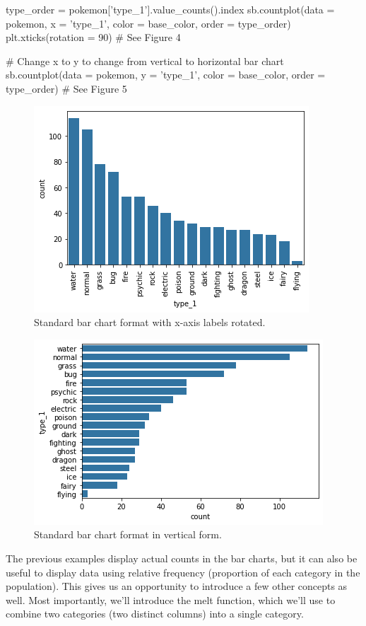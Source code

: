\begin{python}
	type_order = pokemon['type_1'].value_counts().index
	sb.countplot(data = pokemon, x = 'type_1', color = base_color, order = type_order)
	plt.xticks(rotation = 90) 
	# See Figure 4
	
	# Change x to y to change from vertical to horizontal bar chart
	sb.countplot(data = pokemon, y = 'type_1', color = base_color, order = type_order)
	# See Figure 5
\end{python}

\begin{figure}
	\includegraphics{images/figure4.png}
	\caption{Standard bar chart format with x-axis labels rotated.}\label{fig:figure4}
\end{figure}

\begin{figure}
	\includegraphics{images/figure5.png}
	\caption{Standard bar chart format in vertical form.}\label{fig:figure5}
\end{figure}

The previous examples display actual counts in the bar charts, but it can also be useful to display data using relative frequency (proportion of each category in the population). This gives us an opportunity to introduce a few other concepts as well. Most importantly, we'll introduce the melt function, which we'll use to combine two categories (two distinct columns) into a single category.

